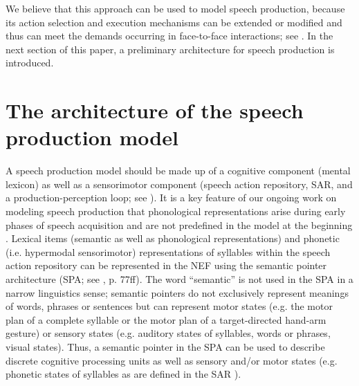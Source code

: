 \documentclass[conference]{IEEEtran}
\begin{document}
We believe that this approach can be used to model speech
production, because its action selection and
execution mechanisms can be extended or modified
and thus can meet the demands occurring in face-to-face interactions;
see \cite{kroger2011}. In the next section of this paper,
a preliminary architecture for speech production is introduced.

\section{The architecture of the speech production model}

A speech production model should be made up of a cognitive component
(mental lexicon) as well as a sensorimotor component (speech action
repository, SAR, and a production-perception loop; see
\cite{kroger2009,kroger2014,kroger2012,kroger2011a,eckers2013,eckers2013a,kroger2010}).
It is a key feature of our ongoing work on modeling speech production
that phonological representations arise during
early phases of speech acquisition and are not predefined in the model
at the beginning
\cite{kroger2009,kroger2014,kroger2011}. Lexical items (semantic as
well as phonological representations) and phonetic (i.e.
hypermodal sensorimotor) representations of syllables within the
speech action repository
\cite{kroger2012,kroger2011a,eckers2013,eckers2013a,kroger2010} can be
represented in the NEF using the semantic pointer architecture (SPA; see
\cite{eliasmith2013}, p. 77ff). The word ``semantic'' is not used in
the SPA in a narrow linguistics sense; semantic pointers do not
exclusively represent meanings of words, phrases or sentences
but can represent motor states (e.g. the motor plan
of a complete syllable or the motor plan of a
target-directed hand-arm gesture) or sensory states
(e.g. auditory states of syllables, words or phrases, visual states).
Thus, a semantic pointer in the SPA can be used to describe
discrete cognitive processing units as well as sensory and/or motor
states (e.g. phonetic states of syllables as are defined in the SAR
\cite{kroger2012,kroger2011a,eckers2013,eckers2013a,kroger2010}).
\end{document}
